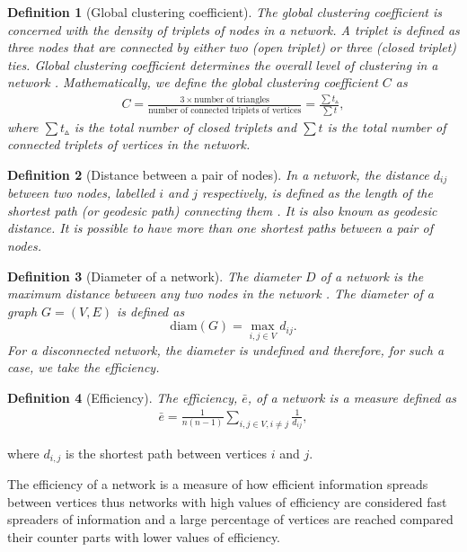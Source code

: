 \documentclass[10pt,a4paper]{article}
\newtheorem{defn}{Definition}
\begin{document}
\begin{defn}[Global clustering coefficient]
	The global clustering coefficient is concerned with the density of triplets of nodes in a network. A triplet is defined as three nodes that are connected by either two (open triplet) or three (closed triplet) ties. Global clustering coefficient determines the overall level of clustering in a network \citep{opsahl2009clustering}.
	Mathematically, we define the global clustering coefficient $C$ as
	\begin{eqnarray}
	C = \frac{3 \times \text{number of triangles}}{\text{number of connected triplets of vertices}} = \frac{\sum t_\vartriangle}{\sum t},
	\end{eqnarray}
	where $\sum t_\vartriangle$ is the total number of closed triplets and $\sum t$ is the total number of connected triplets of vertices in the network.
\end{defn}


\begin{defn}[Distance between a pair of nodes]
	In a network, the distance $d_{ij}$ between two nodes, labelled $i$ and $j$ respectively, is defined as the length of the shortest path (or geodesic path) connecting them \citep{wang2003complex}. It is also known as geodesic distance. It is possible to have more than one shortest paths between a pair of nodes.
\end{defn}
\begin{defn}[Diameter of a network]
	The diameter $D$ of a network is the maximum distance between any two
	nodes in the network \citep{wang2003complex}. The diameter of a graph $G= (V,E )$ is defined as \[ \text{diam}(G ) = \max_{i,j \in V} d_{ij}.\] For a disconnected network, the diameter is undefined and therefore, for such a case, we take the efficiency.
   \end{defn}	
	
	\begin{defn}[Efficiency]
	The efficiency, $\bar{e}$, of a network is a measure defined as
	\begin{eqnarray*}
		\bar{e} =\frac{1}{n(n-1)} \sum_{i,j \in V,i\neq j} \frac{1}{d_{ij}},
		\label{eqn:eff}
	\end{eqnarray*}
\end{defn}
where $d_{i,j}$ is the shortest path between vertices $i$ and $j$.

The efficiency of a network is a measure of how efficient information spreads between vertices thus networks with high values of efficiency are considered fast spreaders of information and a large percentage of vertices are reached compared their counter parts with lower values of efficiency.
\end{document}
